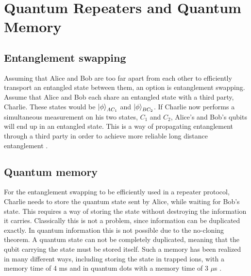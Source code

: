 \section{Quantum Repeaters and Quantum Memory}

\subsection{Entanglement swapping}

Assuming that Alice and Bob are too far apart from each other to efficiently transport an entangled state between them, an option is entanglement swapping. Assume that Alice and Bob each share an entangled state with a third party, Charlie. These states would be $\ket{\phi}_{AC_1}$ and $\ket{\phi}_{BC_2}$. If Charlie now performs a simultaneous measurement on his two states, $C_1$ and $C_2$, Alice's and Bob's qubits will end up in an entangled state. This is a way of propagating entanglement through a third party in order to achieve more reliable long distance entanglement \cite{Azuma:2023}.

\subsection{Quantum memory}

For the entanglement swapping to be efficiently used in a repeater protocol, Charlie needs to store the quantum state sent by Alice, while waiting for Bob's state. This requires a way of storing the state without destroying the information it carries. Classically this is not a problem, since information can be duplicated exactly. In quantum information this is not possible due to the no-cloning theorem. A quantum state can not be completely duplicated, meaning that the qubit carrying the state must be stored itself. Such a memory has been realized in many different ways, including storing the state in trapped ions, with a memory time of 4 ms \cite{trapped_ion_memory} and in quantum dots with a memory time of 3 $\mu$s \cite{dot_memory}.


